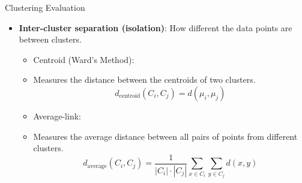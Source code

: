 \documentclass[serif, aspectratio=169]{beamer}
\begin{document}
\begin{frame}{Clustering Evaluation}
    \begin{itemize}
    \item \textbf{Inter-cluster separation (isolation)}: How different the data points are between clusters.
        \begin{itemize}
        \item Centroid (Ward’s Method):
            \item Measures the distance between the centroids of two clusters.
            \[
            d_{\text{centroid}}(C_i, C_j) = d(\mu_i, \mu_j)
            \]
    
        \item Average-link:
            \item Measures the average distance between all pairs of points from different clusters.
            \[
            d_{\text{average}}(C_i, C_j) = \frac{1}{|C_i| \cdot |C_j|} \sum_{x \in C_i} \sum_{y \in C_j} d(x, y)
            \]
        \end{itemize}
    \end{itemize}
\end{frame}
\end{document}
